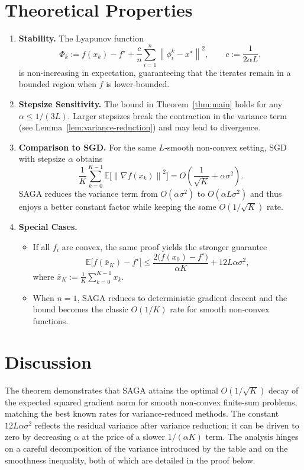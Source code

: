 \documentclass{article}
\newcommand{\E}{\mathbb{E}}
\newcommand{\norm}[1]{\left\|#1\right\|}
\newcommand{\grad}{\nabla}
\begin{document}
\section*{Theoretical Properties}
\begin{enumerate}
\item \textbf{Stability.} The Lyapunov function 
\[
\Phi_k:= f(x_k)-f^{\star}+\frac{c}{n}\sum_{i=1}^{n}\norm{\phi_i^{k}-x^{\star}}^{2},
\qquad c:=\frac{1}{2\alpha L},
\]
is non‑increasing in expectation, guaranteeing that the iterates remain in a bounded region when $f$ is lower‑bounded.

\item \textbf{Stepsize Sensitivity.} The bound in Theorem~\ref{thm:main} holds for any $\alpha\le1/(3L)$. Larger stepsizes break the contraction in the variance term (see Lemma~\ref{lem:variance-reduction}) and may lead to divergence.

\item \textbf{Comparison to SGD.} For the same $L$‑smooth non‑convex setting, SGD with stepsize $\alpha$ obtains
\[
\frac{1}{K}\sum_{k=0}^{K-1}\E\!\bigl[\norm{\grad f(x_k)}^{2}\bigr]
= O\!\left(\frac{1}{\sqrt{K}}+\alpha\sigma^{2}\right).
\]
SAGA reduces the variance term from $O(\alpha\sigma^{2})$ to $O(\alpha L\sigma^{2})$ and thus enjoys a better constant factor while keeping the same $O(1/\sqrt{K})$ rate.

\item \textbf{Special Cases.}
\begin{itemize}
\item If all $f_i$ are convex, the same proof yields the stronger guarantee
\[
\E\!\bigl[f(\bar x_K)-f^{\star}\bigr]\le
\frac{2\bigl(f(x_{0})-f^{\star}\bigr)}{\alpha K}+12L\alpha\sigma^{2},
\]
where $\bar x_K:=\frac{1}{K}\sum_{k=0}^{K-1}x_k$.
\item When $n=1$, SAGA reduces to deterministic gradient descent and the bound becomes the classic $O(1/K)$ rate for smooth non‑convex functions.
\end{itemize}
\end{enumerate}

\section*{Discussion}
The theorem demonstrates that SAGA attains the optimal $O(1/\sqrt{K})$ decay of the expected squared gradient norm for smooth non‑convex finite‑sum problems, matching the best known rates for variance‑reduced methods. The constant $12L\alpha\sigma^{2}$ reflects the residual variance after variance reduction; it can be driven to zero by decreasing $\alpha$ at the price of a slower $1/( \alpha K)$ term. The analysis hinges on a careful decomposition of the variance introduced by the table and on the smoothness inequality, both of which are detailed in the proof below.
\end{document}
